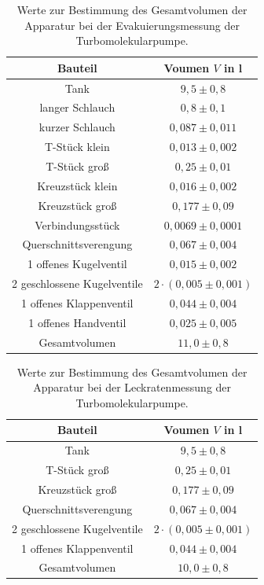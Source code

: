 \begin{table}[H]
\centering
\caption{Werte zur Bestimmung des Gesamtvolumen der Apparatur bei der Evakuierungsmessung der Turbomolekularpumpe.}
\label{tab:Volumen_ET}
\begin{tabular}{c|c}
Bauteil & Voumen $V$ in l\\
\hline
Tank &$9,5 \pm 0,8$\\
langer Schlauch &$0,8 \pm 0,1$\\
kurzer Schlauch &$0,087 \pm 0,011$\\
T-Stück klein&$0,013 \pm 0,002$\\
T-Stück groß &$0,25 \pm 0,01$\\
Kreuzstück klein&$0,016 \pm 0,002$\\
Kreuzstück groß&$0,177 \pm 0,09$\\
Verbindungsstück&$0,0069 \pm 0,0001$\\
Querschnittsverengung&$0,067 \pm 0,004$\\
1 offenes Kugelventil&$0,015 \pm 0,002$\\
2 geschlossene Kugelventile&$ 2 \cdot(0,005 \pm 0,001)$\\
1 offenes Klappenventil&$0,044 \pm 0,004$\\
1 offenes Handventil&$0,025\pm0,005$\\
\hline
Gesamtvolumen&$11,0 \pm 0,8$\\
\end{tabular}
\end{table}

\begin{table}[H]
\centering
\caption{Werte zur Bestimmung des Gesamtvolumen der Apparatur bei der Leckratenmessung der Turbomolekularpumpe.}
\label{tab:Volumen_LT}
\begin{tabular}{c|c}
Bauteil & Voumen $V$ in l\\
\hline
Tank &$9,5 \pm 0,8$\\
T-Stück groß &$0,25 \pm 0,01$\\
Kreuzstück groß&$0,177 \pm 0,09$\\
Querschnittsverengung&$0,067 \pm 0,004$\\
2 geschlossene Kugelventile&$ 2 \cdot(0,005 \pm 0,001)$\\
1 offenes Klappenventil&$0,044 \pm 0,004$\\
\hline
Gesamtvolumen&$10,0\pm0,8$\\
\end{tabular}
\end{table}

